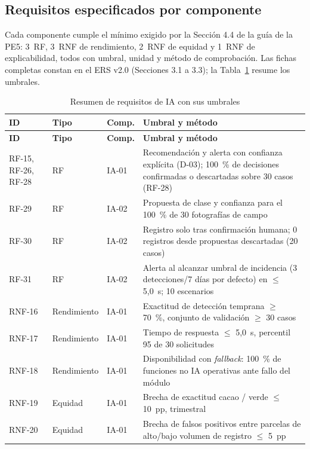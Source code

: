 \subsection{Requisitos especificados por componente}

Cada componente cumple el mínimo exigido por la Sección 4.4 de la guía de la PE5: 3~RF, 3~RNF de rendimiento, 2~RNF de equidad y 1~RNF de explicabilidad, todos con umbral, unidad y método de comprobación. Las fichas completas constan en el ERS v2.0 (Secciones 3.1 a 3.3); la Tabla~\ref{tab:resumen-req-ia} resume los umbrales.

\begin{center}
\begin{longtable}{|p{1.7cm}|p{2.4cm}|p{1.4cm}|p{8.2cm}|}
\caption{Resumen de requisitos de IA con sus umbrales}\label{tab:resumen-req-ia}\\
\hline
\textbf{ID} & \textbf{Tipo} & \textbf{Comp.} & \textbf{Umbral y método} \\
\hline
\endfirsthead
\hline
\textbf{ID} & \textbf{Tipo} & \textbf{Comp.} & \textbf{Umbral y método} \\
\hline
\endhead
\hline
\endfoot
\hline
\endlastfoot
RF-15, RF-26, RF-28 & RF & IA-01 & Recomendación y alerta con confianza explícita (D-03); 100~\% de decisiones confirmadas o descartadas sobre 30 casos (RF-28) \\
\hline
RF-29 & RF & IA-02 & Propuesta de clase y confianza para el 100~\% de 30 fotografías de campo \\
\hline
RF-30 & RF & IA-02 & Registro solo tras confirmación humana; 0 registros desde propuestas descartadas (20 casos) \\
\hline
RF-31 & RF & IA-02 & Alerta al alcanzar umbral de incidencia (3 detecciones/7 días por defecto) en $\leq$ 5,0~s; 10 escenarios \\
\hline
RNF-16 & Rendimiento & IA-01 & Exactitud de detección temprana $\geq$ 70~\%, conjunto de validación $\geq$ 30 casos \\
\hline
RNF-17 & Rendimiento & IA-01 & Tiempo de respuesta $\leq$ 5,0~s, percentil 95 de 30 solicitudes \\
\hline
RNF-18 & Rendimiento & IA-01 & Disponibilidad con \emph{fallback}: 100~\% de funciones no IA operativas ante fallo del módulo \\
\hline
RNF-19 & Equidad & IA-01 & Brecha de exactitud cacao / verde $\leq$ 10~pp, trimestral \\
\hline
RNF-20 & Equidad & IA-01 & Brecha de falsos positivos entre parcelas de alto/bajo volumen de registro $\leq$ 5~pp \\

\end{longtable}
\end{center}
